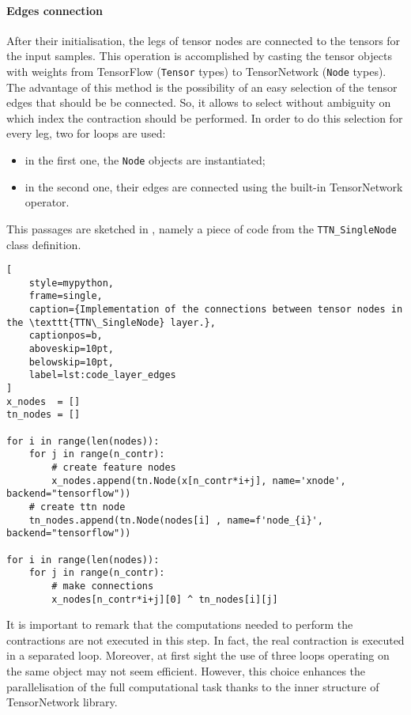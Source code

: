 \documentclass[../main/main.tex]{subfiles}
\begin{document}
\paragraph{Edges connection}
After their initialisation, the legs of tensor nodes are connected to the tensors for the input samples. This operation is accomplished by casting the tensor objects with weights from TensorFlow (\texttt{Tensor} types) to TensorNetwork (\texttt{Node} types). The advantage of this method is the possibility of an easy selection of the tensor edges that should be be connected. So, it allows to select without ambiguity on which index the contraction should be performed. In order to do this selection for every leg, two for loops are used:
\begin{itemize}
    \item in the first one, the \texttt{Node} objects are instantiated;
    \item in the second one, their edges are connected using the built-in TensorNetwork \pyth{^} operator.
\end{itemize}
This passages are sketched in , namely a piece of code from the \texttt{TTN\_SingleNode} class definition.
    

\begin{lstlisting}[
    style=mypython,
    frame=single,
    caption={Implementation of the connections between tensor nodes in the \texttt{TTN\_SingleNode} layer.},
    captionpos=b,
    aboveskip=10pt,
    belowskip=10pt,
    label=lst:code_layer_edges
]
x_nodes  = []
tn_nodes = []

for i in range(len(nodes)):
    for j in range(n_contr):
        # create feature nodes
        x_nodes.append(tn.Node(x[n_contr*i+j], name='xnode', backend="tensorflow"))
    # create ttn node
    tn_nodes.append(tn.Node(nodes[i] , name=f'node_{i}', backend="tensorflow"))

for i in range(len(nodes)):
    for j in range(n_contr): 
        # make connections
        x_nodes[n_contr*i+j][0] ^ tn_nodes[i][j]
\end{lstlisting}


It is important to remark that the computations needed to perform the contractions are not executed in this step. In fact, the real contraction is executed in a separated loop. Moreover, at first sight the use of three loops operating on the same object may not seem efficient. However, this choice enhances the parallelisation of the full computational task thanks to the inner structure of TensorNetwork library.
\end{document}
